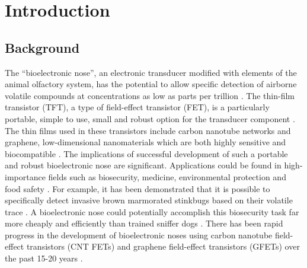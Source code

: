 \documentclass[
  a4paper,
]{scrbook}
\begin{document}
\hypertarget{introduction}{%
\chapter{Introduction}\label{introduction}}

\hypertarget{background}{%
\section{Background}\label{background}}

The ``bioelectronic nose'', an electronic transducer modified with
elements of the animal olfactory system, has the potential to allow
specific detection of airborne volatile compounds at concentrations as
low as parts per trillion
\autocite{Glatz2011,Kwon2015,Dung2018,Kim2022a}. The thin-film
transistor (TFT), a type of field-effect transistor (FET), is a
particularly portable, simple to use, small and robust option for the
transducer component \autocite{Kauffman2008,Khan2020}. The thin films
used in these transistors include carbon nanotube networks and graphene,
low-dimensional nanomaterials which are both highly sensitive and
biocompatible \autocite{Shkodra2021}. The implications of successful
development of such a portable and robust bioelectronic nose are
significant. Applications could be found in high-importance fields such
as biosecurity, medicine, environmental protection and food safety
\autocite{Dung2018,Arakawa2019,Yang2017,Son2017}. For example, it has
been demonstrated that it is possible to specifically detect invasive
brown marmorated stinkbugs based on their volatile trace
\autocite{Moser2020}. A bioelectronic nose could potentially accomplish
this biosecurity task far more cheaply and efficiently than trained
sniffer dogs \autocite{Lee2010,Moon2020,Terutsuki2020}. There has been
rapid progress in the development of bioelectronic noses using carbon
nanotube field-effect transistors (CNT FETs) and graphene field-effect
transistors (GFETs) over the past 15-20 years
\autocite{Yoon2009,Lee2010,Yang2018}.
\end{document}
